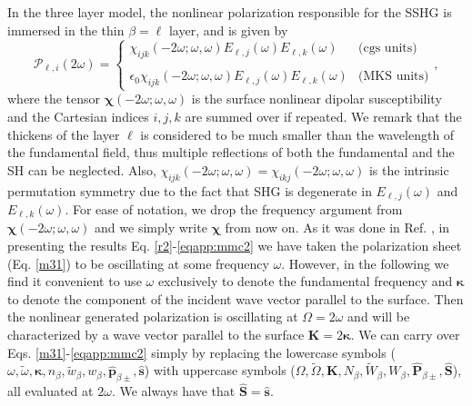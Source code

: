 In the three layer model, the nonlinear polarization responsible for the SSHG is
immersed in the thin $\beta=\ell$ layer, and is given by
\begin{equation}\label{tres}
\mathcal{P}_{\ell,i}(2\omega)=
\left\{
\begin{array}{cc}
  \chi_{ijk}(-2\omega;\omega,\omega)E_{\ell,j}(\omega)E_{\ell,k}(\omega)
& \text{(cgs units)} \\\\
  \epsilon_{0}\chi_{ijk}(-2\omega;\omega,\omega)E_{\ell,j}(\omega)E_{\ell,k}(\omega)
& \text{(MKS units)}
\end{array}
\right.,
\end{equation} 
where the tensor $\boldsymbol{\chi}(-2\omega;\omega,\omega)$ is the surface
nonlinear dipolar susceptibility  and the Cartesian indices $i,j,k$ are summed
over if repeated. 
We remark that the thickens of the layer $\ell$  is considered to be much
smaller than the wavelength of the fundamental field, thus
multiple reflections of both the fundamental and the SH can be neglected.
Also,
$\chi_{ijk}(-2\omega;\omega,\omega)=\chi_{ikj}(-2\omega;\omega,\omega)$ is the
intrinsic permutation symmetry due to the fact that SHG is degenerate in
$E_{\ell,j}(\omega)$ and $E_{\ell,k}(\omega)$. For ease of notation, we drop the
frequency argument from $\boldsymbol{\chi}(-2\omega;\omega,\omega)$ and we
simply write $\boldsymbol{\chi}$ from now on. As it was done in Ref.
\cite{mizrahiJOSA88}, in presenting the results Eq.
\eqref{r2}-\eqref{eqapp:mmc2} we have taken the polarization sheet (Eq. \eqref{m31})
to be oscillating at some frequency $\omega$. However, in the following we find
it convenient to use $\omega$ exclusively to denote the fundamental frequency
and $\boldsymbol{\kappa}$ to denote the component of the incident wave vector
parallel to the surface. Then the nonlinear generated polarization is
oscillating at $\Omega= 2\omega$ and will be characterized by a wave vector
parallel to the surface $\mathbf{K}=2\boldsymbol{\kappa}$. We can carry over
Eqs. \eqref{m31}-\eqref{eqapp:mmc2} simply by replacing the lowercase symbols
($\omega, \tilde{\omega}, \boldsymbol{\kappa}, n_{\beta}, \tilde{w}_{\beta},
w_{\beta}, \hat{\mathbf{p}}_{\beta\pm}, \hat{\mathbf{s}}$) with uppercase
symbols ($\Omega, \tilde{\Omega}, \mathbf{K}, N_{\beta}, \tilde{W}_{\beta},
W_{\beta}, \hat{\mathbf{P}}_{\beta\pm}, \hat{\mathbf{S}}$), all evaluated at
$2\omega$. We always have that $\hat{\mathbf{S}}=\hat{\mathbf{s}}$.

